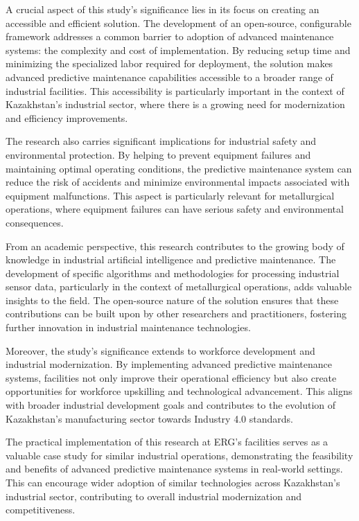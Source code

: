 A crucial aspect of this study's significance lies in its focus on creating an accessible and efficient solution. The development of an open-source, configurable framework addresses a common barrier to adoption of advanced maintenance systems: the complexity and cost of implementation. By reducing setup time and minimizing the specialized labor required for deployment, the solution makes advanced predictive maintenance capabilities accessible to a broader range of industrial facilities. This accessibility is particularly important in the context of Kazakhstan's industrial sector, where there is a growing need for modernization and efficiency improvements.

The research also carries significant implications for industrial safety and environmental protection. By helping to prevent equipment failures and maintaining optimal operating conditions, the predictive maintenance system can reduce the risk of accidents and minimize environmental impacts associated with equipment malfunctions. This aspect is particularly relevant for metallurgical operations, where equipment failures can have serious safety and environmental consequences.

From an academic perspective, this research contributes to the growing body of knowledge in industrial artificial intelligence and predictive maintenance. The development of specific algorithms and methodologies for processing industrial sensor data, particularly in the context of metallurgical operations, adds valuable insights to the field. The open-source nature of the solution ensures that these contributions can be built upon by other researchers and practitioners, fostering further innovation in industrial maintenance technologies.

Moreover, the study's significance extends to workforce development and industrial modernization. By implementing advanced predictive maintenance systems, facilities not only improve their operational efficiency but also create opportunities for workforce upskilling and technological advancement. This aligns with broader industrial development goals and contributes to the evolution of Kazakhstan's manufacturing sector towards Industry 4.0 standards.

The practical implementation of this research at ERG's facilities serves as a valuable case study for similar industrial operations, demonstrating the feasibility and benefits of advanced predictive maintenance systems in real-world settings. This can encourage wider adoption of similar technologies across Kazakhstan's industrial sector, contributing to overall industrial modernization and competitiveness.
